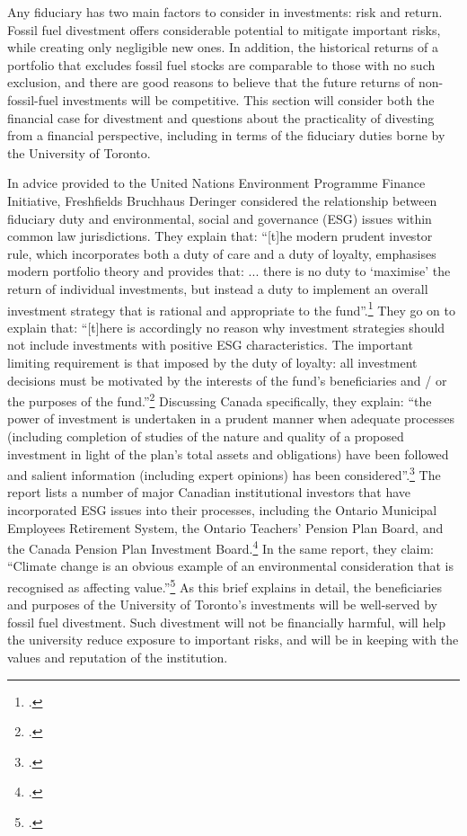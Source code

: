 	

Any fiduciary has two main factors to consider in investments: risk and return.
Fossil fuel divestment offers considerable potential to mitigate important risks, while creating only negligible new ones.
In addition, the historical returns of a portfolio that excludes fossil fuel stocks are comparable to those with no such exclusion, and there are good reasons to believe that the future returns of non-fossil-fuel investments will be competitive.
This section will consider both the financial case for divestment and questions about the practicality of divesting from a financial perspective, including in terms of the fiduciary duties borne by the University of Toronto.



In advice provided to the United Nations Environment Programme Finance Initiative, Freshfields Bruchhaus Deringer considered the relationship between fiduciary duty and environmental, social and governance (ESG) issues within common law jurisdictions.
They explain that: ``[t]he modern prudent investor rule, which incorporates both a duty of care and a duty of loyalty, emphasises modern portfolio theory and provides that: ... there is no duty to `maximise' the return of individual investments, but instead a duty to implement an overall investment strategy that is rational and appropriate to the fund''.\footcite[][p. 6]{UNEPFinanceInit}
They go on to explain that: ``[t]here is accordingly no reason why investment strategies should not include investments with positive ESG characteristics. The important limiting requirement is that imposed by the duty of loyalty: all investment decisions must be motivated by the interests of the fund's beneficiaries and / or the purposes of the fund.''\footcite[][p. 6]{UNEPFinanceInit}
Discussing Canada specifically, they explain: ``the power of investment is undertaken in a prudent manner when adequate processes (including completion of studies of the nature and quality of a proposed investment in light of the plan's total assets and obligations) have been followed and salient information (including expert opinions) has been considered''.\footcite[][p. 51]{UNEPFinanceInit}
The report lists a number of major Canadian institutional investors that have incorporated ESG issues into their processes, including the Ontario Municipal Employees Retirement System, the Ontario Teachers' Pension Plan Board, and the Canada Pension Plan Investment Board.\footcite[][p. 52]{UNEPFinanceInit}
In the same report, they claim: ``Climate change is an obvious example of an environmental consideration that is recognised as affecting value.''\footcite[][p. 11]{UNEPFinanceInit}
As this brief explains in detail, the beneficiaries and purposes of the University of Toronto's investments will be well-served by fossil fuel divestment.
Such divestment will not be financially harmful, will help the university reduce exposure to important risks, and will be in keeping with the values and reputation of the institution.




